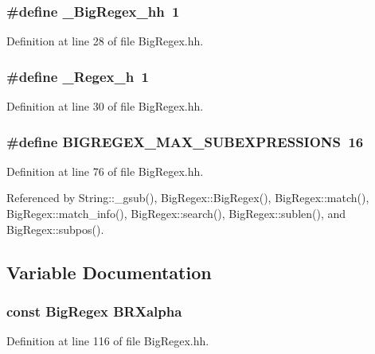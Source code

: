 \subsubsection{\setlength{\rightskip}{0pt plus 5cm}\#define \_\-Big\-Regex\_\-hh\ 1}\label{BigRegex_8hh_a0}




Definition at line 28 of file Big\-Regex.hh.
\subsubsection{\setlength{\rightskip}{0pt plus 5cm}\#define \_\-Regex\_\-h\ 1}\label{BigRegex_8hh_a1}




Definition at line 30 of file Big\-Regex.hh.
\subsubsection{\setlength{\rightskip}{0pt plus 5cm}\#define BIGREGEX\_\-MAX\_\-SUBEXPRESSIONS\ 16}\label{BigRegex_8hh_a2}




Definition at line 76 of file Big\-Regex.hh.

Referenced by String::\_\-gsub(), Big\-Regex::Big\-Regex(), Big\-Regex::match(), Big\-Regex::match\_\-info(), Big\-Regex::search(), Big\-Regex::sublen(), and Big\-Regex::subpos().

\subsection{Variable Documentation}
\subsubsection{\setlength{\rightskip}{0pt plus 5cm}const {\bf Big\-Regex} BRXalpha}\label{BigRegex_8hh_a6}




Definition at line 116 of file Big\-Regex.hh.
